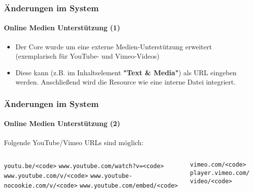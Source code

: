 
\begin{frame}[fragile]
	\frametitle{Änderungen im System}
	\framesubtitle{Online Medien Unterstützung (1)}

	\begin{itemize}

		\item Der Core wurde um eine externe Medien-Unterstützung erweitert\newline
			\small
				(exemplarisch für YouTube- und Vimeo-Videos)
			\normalsize

		\item Diese kann (z.B. im Inhaltselement \textbf{"Text \& Media"}) als URL
			eingeben werden. Anschließend wird die Resource wie eine interne Datei integriert.

	\end{itemize}

\end{frame}


\begin{frame}[fragile]
	\frametitle{Änderungen im System}
	\framesubtitle{Online Medien Unterstützung (2)}

	Folgende YouTube/Vimeo URLs sind möglich:
	\vspace{0.4cm}

	\begin{columns}[T]
		\begin{column}{.52\textwidth}
			\smaller
				\tabto{0.2cm}\texttt{youtu.be/<code>}\newline
				\tabto{0.2cm}\texttt{www.youtube.com/watch?v=<code>}\newline
				\tabto{0.2cm}\texttt{www.youtube.com/v/<code>}\newline
				\tabto{0.2cm}\texttt{www.youtube-nocookie.com/v/<code>}\newline
				\tabto{0.2cm}\texttt{www.youtube.com/embed/<code>}\newline
		\end{column}
		\begin{column}{.48\textwidth}
			\vspace{-0.25cm}\smaller
				\texttt{vimeo.com/<code>}\newline
				\texttt{player.vimeo.com/video/<code>}\newline
		\end{column}
	\end{columns}

\end{frame}

